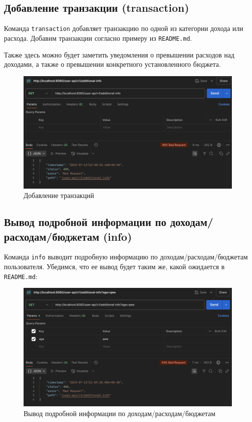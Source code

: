 \documentclass[a4paper, 14pt]{article}
\begin{document}
\subsection{Добавление транзакции (transaction)}

Команда \texttt{transaction} добавляет транзакцию по одной из категории дохода или расхода. Добавим транзакции согласно примеру из \texttt{README.md}.

Также здесь можно будет заметить уведомления о превышении расходов над доходами, а также о превышении конкретного установленного бюджета.

\begin{figure}[H]
	\centering
	\includegraphics[width=13cm]{resources/9.png}
	\caption{Добавление транзакций}
\end{figure}

\subsection{Вывод подробной информации по доходам/расходам/бюджетам (info)}

Команда \texttt{info} выводит подробную информацию по доходам/расходам/бюджетам пользователя. Убедимся, что ее вывод будет таким же, какой ожидается в \texttt{README.md}:

\begin{figure}[H]
	\centering
	\includegraphics[width=13cm]{resources/10.png}
	\caption{Вывод подробной информации по доходам/расходам/бюджетам}
\end{figure}
\end{document}
